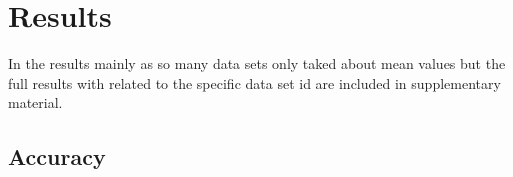 \section{Results}

In the results mainly as so many data sets only taked about mean values but the full results with related to the specific data set id are included in supplementary material.







\subsection{Accuracy}

